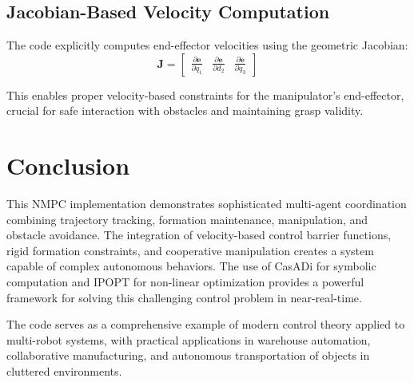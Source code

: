 \documentclass[12pt,a4paper]{article}
\begin{document}
\subsection{Jacobian-Based Velocity Computation}
The code explicitly computes end-effector velocities using the geometric Jacobian:
\[
\mathbf{J} = \begin{bmatrix}
\frac{\partial \mathbf{e}}{\partial q_1} & \frac{\partial \mathbf{e}}{\partial d_2} & \frac{\partial \mathbf{e}}{\partial q_3}
\end{bmatrix}
\]

This enables proper velocity-based constraints for the manipulator's end-effector, crucial for safe interaction with obstacles and maintaining grasp validity.

\section{Conclusion}

This NMPC implementation demonstrates sophisticated multi-agent coordination combining trajectory tracking, formation maintenance, manipulation, and obstacle avoidance. The integration of velocity-based control barrier functions, rigid formation constraints, and cooperative manipulation creates a system capable of complex autonomous behaviors. The use of CasADi for symbolic computation and IPOPT for non-linear optimization provides a powerful framework for solving this challenging control problem in near-real-time.

The code serves as a comprehensive example of modern control theory applied to multi-robot systems, with practical applications in warehouse automation, collaborative manufacturing, and autonomous transportation of objects in cluttered environments.
\end{document}
